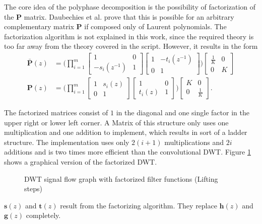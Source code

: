 \begin{refsection}
The core idea of the polyphase decomposition is the possibility of factorization of the $\bm P$ matrix.
Daubechies et al. prove that this is possible for an arbitrary complementary matrix $\bm P$ if composed only of Laurent polynomials.
The factorization algorithm is not explained in this work, since the required theory is too far away from the theory covered in the script.
However, it results in the form
\begin{align}
	\bm{\bar P}(z) &=
	\Biggl(
	\prod_{i=1}^{m}
	\begin{bmatrix}
		1 & 0 \\
		-s_i(z^{-1}) & 1
	\end{bmatrix}
	\begin{bmatrix}
		1 & -t_i(z^{-1}) \\
		0 & 1
	\end{bmatrix}
	\Biggr)
	\begin{bmatrix}
		\frac{1}{K} & 0 \\
		0 & K
	\end{bmatrix}
	\\
	\bm P(z) &=
	\Biggl(
	\prod_{i=1}^{m}
	\begin{bmatrix}
		1 & s_i(z) \\
		0 & 1
	\end{bmatrix}
	\begin{bmatrix}
		1 & 0 \\
		t_i(z) & 1
	\end{bmatrix}
	\Biggr)
	\begin{bmatrix}
		K & 0 \\
		0 & \frac{1}{K}
	\end{bmatrix}
	.
\end{align}

The factorized matrices consist of $1$ in the diagonal and one single factor in the upper right or lower left corner.
A Matrix of this structure only uses one multiplication and one addition to implement, which results in sort of a ladder structure.
The implementation uses only $2(i+1)$ multiplications and $2i$ additions and is two times more efficient than the convolutional DWT.
Figure \ref{fpga:fig:liftingStepFactorization} shows a graphical version of the factorized DWT.
\begin{figure}
	\centering
	
	
	\caption{DWT signal flow graph with factorized filter functions (Lifting steps)}
	\label{fpga:fig:liftingStepFactorization}
\end{figure}
$\bm s(z)$ and $\bm t(z)$ result from the factorizing algorithm.
They replace $\bm h(z)$ and $\bm g(z)$ completely.




\end{refsection}
